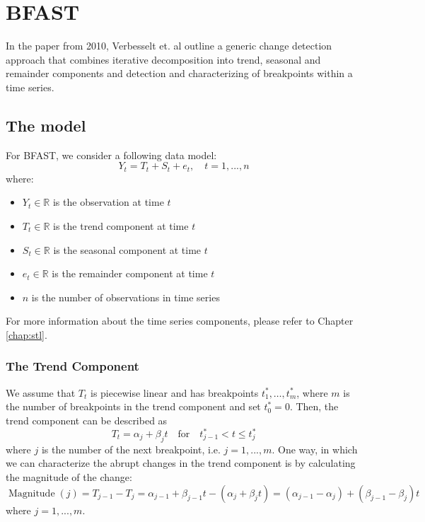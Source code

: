 \documentclass[main.tex]{subfiles}
\begin{document}
\chapter{BFAST}
\label{chap:bfast}
In the paper from 2010\cite{bfast}, Verbesselt et. al outline a generic change detection approach
that combines iterative decomposition into trend, seasonal and remainder components and detection
and characterizing of breakpoints within a time series. 

\section{The model}
\label{sec:bfast_the_model}
For BFAST, we consider a following data model:
\[
Y_t = T_t + S_t + e_t, \quad t = 1,...,n
\]
where:
\begin{itemize}
\item $Y_t \in \mathbb{R}$ is the observation at time $t$
\item $T_t \in \mathbb{R}$ is the trend component at time $t$
\item $S_t \in \mathbb{R}$ is the seasonal component at time $t$
\item $e_t \in \mathbb{R}$ is the remainder component at time $t$
\item $n$ is the number of observations in time series
\end{itemize}
For more information about the time series components, please refer to Chapter
\ref{chap:stl}.
\subsection{The Trend Component}
\label{subsec:trend}
We assume that $T_t$ is piecewise linear and has breakpoints $t_1^*,\hdots, t_m^*$,
where $m$ is the number of breakpoints in the trend component and set $t_0^* = 0$.
Then, the trend component can be described as
\[
T_t = \alpha_j + \beta_j t \quad \text{for}\quad t^*_{j-1}<t\leq t_j^*
\]
where $j$ is the number of the next breakpoint, i.e. $j = 1,...,m$. One way, in
which we can characterize the abrupt changes in the trend component is by
calculating the magnitude of the change:
\[
\operatorname{Magnitude}(j) = T_{j-1} - T_{j} = \alpha_{j-1} + \beta_{j-1} t -
(\alpha_j + \beta_j t) = (\alpha_{j-1} - \alpha_j) + (\beta_{j-1} - \beta_j)t
\]
where $j = 1,...,m$.
\end{document}
